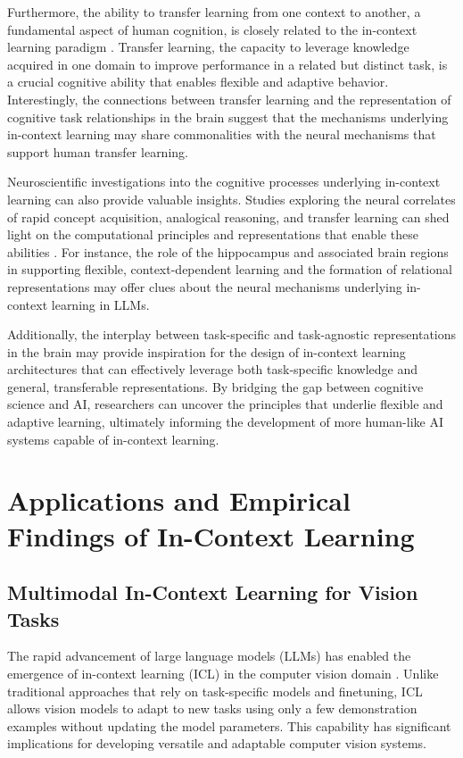 \documentclass[11pt]{article}
\begin{document}
Furthermore, the ability to transfer learning from one context to another, a fundamental aspect of human cognition, is closely related to the in-context learning paradigm \cite{ref52}. Transfer learning, the capacity to leverage knowledge acquired in one domain to improve performance in a related but distinct task, is a crucial cognitive ability that enables flexible and adaptive behavior. Interestingly, the connections between transfer learning and the representation of cognitive task relationships in the brain \cite{ref52} suggest that the mechanisms underlying in-context learning may share commonalities with the neural mechanisms that support human transfer learning.

Neuroscientific investigations into the cognitive processes underlying in-context learning can also provide valuable insights. Studies exploring the neural correlates of rapid concept acquisition, analogical reasoning, and transfer learning can shed light on the computational principles and representations that enable these abilities \cite{ref53}. For instance, the role of the hippocampus and associated brain regions in supporting flexible, context-dependent learning and the formation of relational representations \cite{ref53} may offer clues about the neural mechanisms underlying in-context learning in LLMs.

Additionally, the interplay between task-specific and task-agnostic representations in the brain \cite{ref52} may provide inspiration for the design of in-context learning architectures that can effectively leverage both task-specific knowledge and general, transferable representations. By bridging the gap between cognitive science and AI, researchers can uncover the principles that underlie flexible and adaptive learning, ultimately informing the development of more human-like AI systems capable of in-context learning.

\section{Applications and Empirical Findings of In-Context Learning}

\subsection{Multimodal In-Context Learning for Vision Tasks}

The rapid advancement of large language models (LLMs) has enabled the emergence of in-context learning (ICL) in the computer vision domain \cite{ref25,ref54}. Unlike traditional approaches that rely on task-specific models and finetuning, ICL allows vision models to adapt to new tasks using only a few demonstration examples without updating the model parameters. This capability has significant implications for developing versatile and adaptable computer vision systems.
\end{document}
